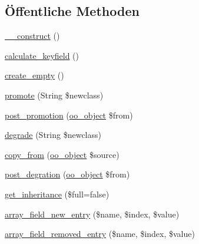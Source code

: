 \subsection*{Öffentliche Methoden}
\begin{DoxyCompactItemize}
\item 
\hyperlink{classSunhill_1_1Objects_1_1oo__object_a7450582caad79846b1091fbe98e85a0b}{\+\_\+\+\_\+construct} ()
\item 
\hyperlink{classSunhill_1_1Objects_1_1oo__object_a3cb1bc3d07f6c850fc5705e656c898c0}{calculate\+\_\+keyfield} ()
\item 
\hyperlink{classSunhill_1_1Objects_1_1oo__object_a8000eb1f967c9d8057890b20bd5e1667}{create\+\_\+empty} ()
\item 
\hyperlink{classSunhill_1_1Objects_1_1oo__object_a1ec0f5f9ff8bf9439d2bbbd06d5ecc72}{promote} (String \$newclass)
\item 
\hyperlink{classSunhill_1_1Objects_1_1oo__object_a96aabba5eb79b5f20a1a3423ae210bea}{post\+\_\+promotion} (\hyperlink{classSunhill_1_1Objects_1_1oo__object}{oo\+\_\+object} \$from)
\item 
\hyperlink{classSunhill_1_1Objects_1_1oo__object_af0ae041fcabc77e1e82cbe7ed49c6eb1}{degrade} (String \$newclass)
\item 
\hyperlink{classSunhill_1_1Objects_1_1oo__object_a5fd7459ede2e80a6ae5d4e31a5b072da}{copy\+\_\+from} (\hyperlink{classSunhill_1_1Objects_1_1oo__object}{oo\+\_\+object} \$source)
\item 
\hyperlink{classSunhill_1_1Objects_1_1oo__object_af1a07600c748e4058b15c25a6d74c1bb}{post\+\_\+degration} (\hyperlink{classSunhill_1_1Objects_1_1oo__object}{oo\+\_\+object} \$from)
\item 
\hyperlink{classSunhill_1_1Objects_1_1oo__object_a022b85913cd018dcdcb35b5709cfa2d0}{get\+\_\+inheritance} (\$full=false)
\item 
\hyperlink{classSunhill_1_1Objects_1_1oo__object_a68846463a58bc9493c3e925bd3558bfa}{array\+\_\+field\+\_\+new\+\_\+entry} (\$name, \$index, \$value)
\item 
\hyperlink{classSunhill_1_1Objects_1_1oo__object_a761ae6b444d598f595ef6366e275a924}{array\+\_\+field\+\_\+removed\+\_\+entry} (\$name, \$index, \$value)
\end{DoxyCompactItemize}
